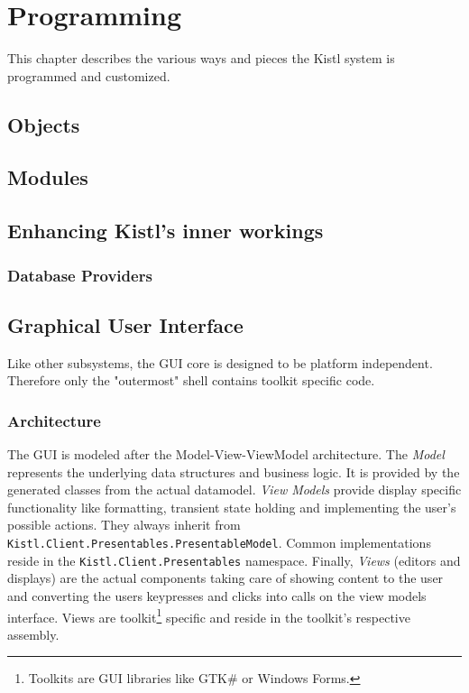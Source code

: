 \chapter{Programming}

This chapter describes the various ways and pieces the Kistl system is
programmed and customized.

\section{Objects}

\section{Modules}

\section{Enhancing Kistl's inner workings}

\subsection{Database Providers}

\section{Graphical User Interface}

Like other subsystems, the GUI core is designed to be platform
independent. Therefore only the "outermost" shell contains toolkit
specific code.

\subsection{Architecture}

The GUI is modeled after the Model-View-ViewModel architecture. The
\emph{Model} represents the underlying data structures and business
logic. It is provided by the generated classes from the actual
datamodel. \emph{View Models} provide display specific functionality
like formatting, transient state holding and implementing the user's
possible actions. They always inherit from
\texttt{Kistl.Client.Presentables.PresentableModel}. Common
implementations reside in the \texttt{Kistl.Client.Presentables}
namespace. Finally, \emph{Views} (editors and displays) are the actual
components taking care of showing content to the user and converting the
users keypresses and clicks into calls on the view models interface.
Views are toolkit\footnote{Toolkits are GUI libraries like GTK\# or
Windows Forms.} specific and reside in the toolkit's respective
assembly.

